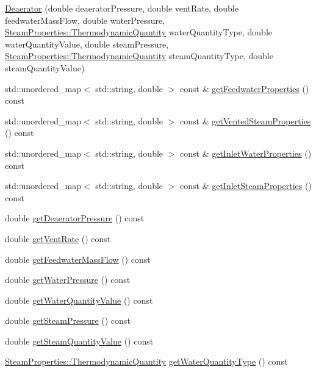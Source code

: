 \begin{DoxyCompactItemize}
\item 
\hyperlink{class_deaerator_a02311c34cbe46384187292e5f844984c}{Deaerator} (double deaerator\+Pressure, double vent\+Rate, double feedwater\+Mass\+Flow, double water\+Pressure, \hyperlink{class_steam_properties_ae0294bedf7d178c2d8fb6aed0f62fbff}{Steam\+Properties\+::\+Thermodynamic\+Quantity} water\+Quantity\+Type, double water\+Quantity\+Value, double steam\+Pressure, \hyperlink{class_steam_properties_ae0294bedf7d178c2d8fb6aed0f62fbff}{Steam\+Properties\+::\+Thermodynamic\+Quantity} steam\+Quantity\+Type, double steam\+Quantity\+Value)
\item 
std\+::unordered\+\_\+map$<$ std\+::string, double $>$ const  \& \hyperlink{class_deaerator_a74f7916b125f4964b0f534940f590633}{get\+Feedwater\+Properties} () const
\item 
std\+::unordered\+\_\+map$<$ std\+::string, double $>$ const  \& \hyperlink{class_deaerator_aba77ebc41e5b05d6e2463793bacbcbc0}{get\+Vented\+Steam\+Properties} () const
\item 
std\+::unordered\+\_\+map$<$ std\+::string, double $>$ const  \& \hyperlink{class_deaerator_a6dccf8495324c76a5d9b6128c57c0427}{get\+Inlet\+Water\+Properties} () const
\item 
std\+::unordered\+\_\+map$<$ std\+::string, double $>$ const  \& \hyperlink{class_deaerator_ae777da23f2504f8724850946378b3cf5}{get\+Inlet\+Steam\+Properties} () const
\item 
double \hyperlink{class_deaerator_ac16cacdeef74e45f951fe992bac4e9e3}{get\+Deaerator\+Pressure} () const
\item 
double \hyperlink{class_deaerator_ad0262491c2bd9a6f820eaaba54498bcd}{get\+Vent\+Rate} () const
\item 
double \hyperlink{class_deaerator_ae1524e8b406c3d5c2823ae4e6bafe389}{get\+Feedwater\+Mass\+Flow} () const
\item 
double \hyperlink{class_deaerator_ae86ef305a8641d61ec76bd39bb84f28b}{get\+Water\+Pressure} () const
\item 
double \hyperlink{class_deaerator_a9362430fb04802b6f14c9bf09d62a466}{get\+Water\+Quantity\+Value} () const
\item 
double \hyperlink{class_deaerator_aebe779c63cace193d040f497e3b70728}{get\+Steam\+Pressure} () const
\item 
double \hyperlink{class_deaerator_a5473feedca64e7c44143d422ed3e2401}{get\+Steam\+Quantity\+Value} () const
\item 
\hyperlink{class_steam_properties_ae0294bedf7d178c2d8fb6aed0f62fbff}{Steam\+Properties\+::\+Thermodynamic\+Quantity} \hyperlink{class_deaerator_a414282f81906e09a28bc75cf51659ec2}{get\+Water\+Quantity\+Type} () const

\end{DoxyCompactItemize}
